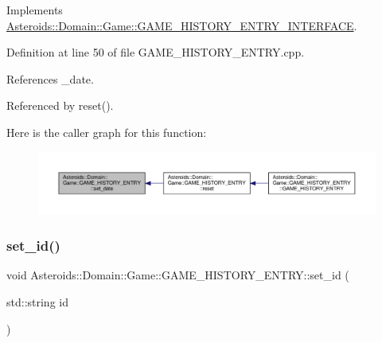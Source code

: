 Implements \hyperlink{classAsteroids_1_1Domain_1_1Game_1_1GAME__HISTORY__ENTRY__INTERFACE_a07eaeb99de0c71ed6353a21b513ce43b}{Asteroids\+::\+Domain\+::\+Game\+::\+G\+A\+M\+E\+\_\+\+H\+I\+S\+T\+O\+R\+Y\+\_\+\+E\+N\+T\+R\+Y\+\_\+\+I\+N\+T\+E\+R\+F\+A\+CE}.



Definition at line 50 of file G\+A\+M\+E\+\_\+\+H\+I\+S\+T\+O\+R\+Y\+\_\+\+E\+N\+T\+R\+Y.\+cpp.



References \+\_\+date.



Referenced by reset().

Here is the caller graph for this function\+:\nopagebreak
\begin{figure}[H]
\begin{center}
\leavevmode
\includegraphics[width=350pt]{classAsteroids_1_1Domain_1_1Game_1_1GAME__HISTORY__ENTRY_adb0e9c9f31373615343821a552366b37_icgraph}
\end{center}
\end{figure}
\mbox{\label{classAsteroids_1_1Domain_1_1Game_1_1GAME__HISTORY__ENTRY_a888db2c5c245eed8e4d43fef01ac08df}} 
\subsubsection{\texorpdfstring{set\+\_\+id()}{set\_id()}}
{\footnotesize\ttfamily void Asteroids\+::\+Domain\+::\+Game\+::\+G\+A\+M\+E\+\_\+\+H\+I\+S\+T\+O\+R\+Y\+\_\+\+E\+N\+T\+R\+Y\+::set\+\_\+id (\begin{DoxyParamCaption}\item[{std\+::string}]{id }\end{DoxyParamCaption})\hspace{0.3cm}{\ttfamily [virtual]}}



